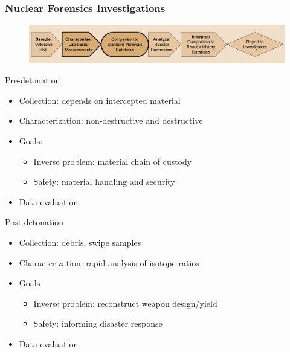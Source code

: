 
\begin{frame}
  \frametitle{Nuclear Forensics Investigations}
  \begin{adjustwidth}{-10pt}{0pt}
  \begin{figure}
    \centering
    \includegraphics[width=\textwidth]{./figures/forensicsrealworld.png}
  \end{figure}
  \vspace{-3mm}
  \begin{minipage}[t]{0.5\textwidth}
    \begin{block}{Pre-detonation}
      \begin{itemize}
        \item<1-> Collection: depends on intercepted material
        \item<2-> Characterization: non-destructive and destructive
        \item<3-> Goals:
        \begin{itemize}
          \item Inverse problem: material chain of custody
          \item Safety: material handling and security
        \end{itemize}
        \item<4-> Data evaluation
      \end{itemize}
    \end{block}
  \end{minipage}%
  \hfill
  \begin{minipage}[t]{0.5\textwidth}
    \begin{block}{Post-detonation}
      \begin{itemize}
        \item<1-> Collection: debris, swipe samples
        \item<2-> Characterization: rapid analysis of isotope ratios
        \item<3-> Goals
        \begin{itemize}
          \item Inverse problem: reconstruct weapon design/yield
          \item Safety: informing disaster response
        \end{itemize}
        \item<4-> Data evaluation
      \end{itemize}
    \end{block}
  \end{minipage}
  \end{adjustwidth}
\end{frame}

